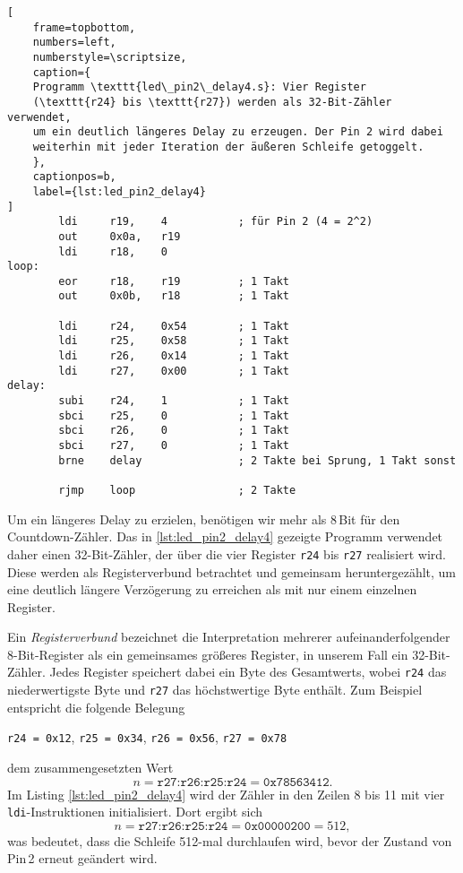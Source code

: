 \documentclass[a4paper,12pt]{article}
\begin{document}
\begin{listing}[htbp]
\begin{lstlisting}[
    frame=topbottom,
    numbers=left,
    numberstyle=\scriptsize,
    caption={
	Programm \texttt{led\_pin2\_delay4.s}: Vier Register
	(\texttt{r24} bis \texttt{r27}) werden als 32-Bit-Zähler verwendet,
	um ein deutlich längeres Delay zu erzeugen. Der Pin 2 wird dabei
	weiterhin mit jeder Iteration der äußeren Schleife getoggelt.
    },
    captionpos=b,
    label={lst:led_pin2_delay4}
]
        ldi     r19,    4           ; für Pin 2 (4 = 2^2)
        out     0x0a,   r19
        ldi     r18,    0
loop:
        eor     r18,    r19         ; 1 Takt
        out     0x0b,   r18         ; 1 Takt

        ldi     r24,    0x54        ; 1 Takt
        ldi     r25,    0x58        ; 1 Takt
        ldi     r26,    0x14        ; 1 Takt
        ldi     r27,    0x00        ; 1 Takt
delay:
        subi    r24,    1           ; 1 Takt
        sbci    r25,    0           ; 1 Takt
        sbci    r26,    0           ; 1 Takt
        sbci    r27,    0           ; 1 Takt
        brne    delay               ; 2 Takte bei Sprung, 1 Takt sonst

        rjmp    loop                ; 2 Takte
\end{lstlisting}
\end{listing}


\noindent
Um ein längeres Delay zu erzielen, benötigen wir mehr als 8 Bit für den
Countdown-Zähler. Das in \autoref{lst:led_pin2_delay4} gezeigte Programm
verwendet daher einen 32-Bit-Zähler, der über die vier Register \texttt{r24}
bis \texttt{r27} realisiert wird. Diese werden als Registerverbund betrachtet
und gemeinsam heruntergezählt, um eine deutlich längere Verzögerung zu
erreichen als mit nur einem einzelnen Register.

Ein \emph{Registerverbund} bezeichnet die Interpretation mehrerer
aufeinanderfolgender 8-Bit-Register als ein gemeinsames größeres Register, in
unserem Fall ein 32-Bit-Zähler. Jedes Register speichert dabei ein Byte des
Gesamtwerts, wobei \texttt{r24} das niederwertigste Byte und \texttt{r27} das
höchstwertige Byte enthält. Zum Beispiel entspricht die folgende Belegung

\begin{center}
    \texttt{r24 = 0x12}, \quad \texttt{r25 = 0x34},
    \quad \texttt{r26 = 0x56}, \quad \texttt{r27 = 0x78}
\end{center}

\noindent
dem zusammengesetzten Wert
\[
    n = \texttt{r27:r26:r25:r24} = \texttt{0x78563412}.
\]
Im Listing \autoref{lst:led_pin2_delay4} wird der Zähler in den Zeilen 8 bis 11
mit vier \texttt{ldi}-Instruktionen initialisiert. Dort ergibt sich
\[
    n = \texttt{r27:r26:r25:r24} = \texttt{0x00000200} = 512,
\]
was bedeutet, dass die Schleife 512-mal durchlaufen wird, bevor der Zustand von
Pin 2 erneut geändert wird.
\end{document}
